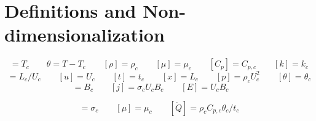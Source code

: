 \documentclass[11pt]{article}
\begin{document}
\section{Definitions and Non-dimensionalization}
\begin{equation}
	[T] = T_c \qquad
	\theta = T-T_c \qquad
	[\rho] = \rho_c \qquad
	[\mu] = \mu_c \qquad
	[C_p] = C_{p,c} \qquad
	[k] = k_c
\end{equation}
\begin{equation}
	[t_c] = L_c/U_c \qquad
	[u] = U_c \qquad
	[t] = t_c \qquad
	[x] = L_c \qquad
	[p] = \rho_c U_c^2 \qquad
	[\theta] = \theta_c
\end{equation}
\begin{equation}
	[B] = B_c  \qquad
	[j] = \sigma_c U_c B_c \qquad
	[E] = U_c B_c \qquad
\end{equation}

\begin{equation}
	[\sigma] = \sigma_c \qquad
	[\mu] = \mu_c \qquad
	[\dot{Q}] = \rho_c C_{p,c} \theta_c / t_c
\end{equation}
\end{document}

